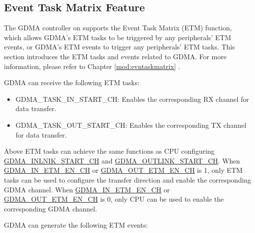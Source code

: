 \documentclass[main\_\_EN.tex]{subfiles}
\begin{document}
\subsection{Event Task Matrix Feature}\label{sec:dma-etm-func}

The GDMA controller on \chipname{} supports the Event Task Matrix (ETM) function, which allows GDMA's ETM tasks to be triggered by any peripherals' ETM events, or GDMA's ETM events to trigger any peripherals' ETM tasks. This section introduces the ETM tasks and events related to GDMA. For more information, please refer to Chapter \ref{mod:evntaskmatrix} .

GDMA can receive the following ETM tasks:

\begin{itemize}
    \item GDMA\_TASK\_IN\_START\_CH: Enables the corresponding RX channel  for data transfer.
    \item GDMA\_TASK\_OUT\_START\_CH: Enables the corresponding TX channel  for data transfer.
\end{itemize}

\begin{tiplisting}
Above ETM tasks can achieve the same functions as CPU configuring \hyperref[fielddesc:GDMAINLINKSTARTCHN]{GDMA\_INLNIK\_START\_CH} and \hyperref[fielddesc:GDMAOUTLINKSTARTCHN]{GDMA\_OUTLINK\_START\_CH}. When \hyperref[fielddesc:GDMAINETMENCHN]{GDMA\_IN\_ETM\_EN\_CH}  or \hyperref[fielddesc:GDMAOUTETMENCHN]{GDMA\_OUT\_ETM\_EN\_CH} is 1, only ETM tasks can be used to configure the transfer direction and enable the corresponding GDMA channel. When \hyperref[fielddesc:GDMAINETMENCHN]{GDMA\_IN\_ETM\_EN\_CH} or \hyperref[fielddesc:GDMAOUTETMENCHN]{GDMA\_OUT\_ETM\_EN\_CH} is 0, only CPU can be used to enable the corresponding GDMA channel.
\end{tiplisting}

GDMA can generate the following ETM events:
\end{document}
